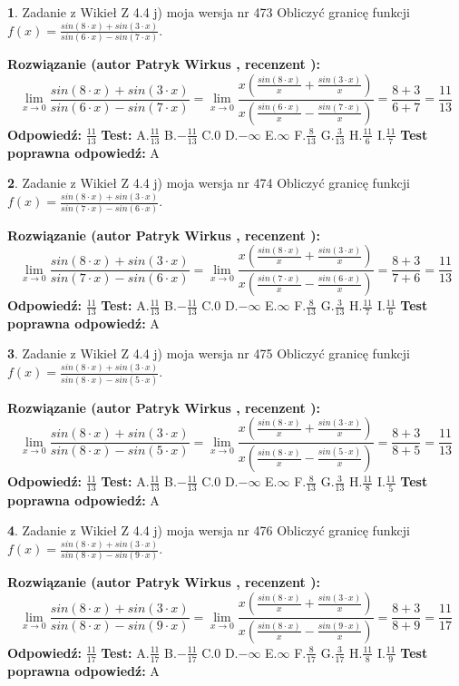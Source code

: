 \documentclass[12pt, a4paper]{article}
\theoremstyle{definition} %
\newtheorem{zad}{}
\newcommand{\zadStart}[1]{\begin{zad}#1\newline}
\newcommand{\zadStop}{\end{zad}}
\newcommand{\rozwStart}[2]{\noindent \textbf{Rozwiązanie (autor #1 , recenzent #2): }\newline}
\newcommand{\rozwStop}{\newline}
\newcommand{\odpStart}{\noindent \textbf{Odpowiedź:}\newline}
\newcommand{\odpStop}{\newline}
\newcommand{\testStart}{\noindent \textbf{Test:}\newline}
\newcommand{\testStop}{\newline}
\newcommand{\kluczStart}{\noindent \textbf{Test poprawna odpowiedź:}\newline}
\newcommand{\kluczStop}{\newline}
\begin{document}
\zadStart{Zadanie z Wikieł Z 4.4 j) moja wersja nr 473}
Obliczyć granicę funkcji $f(x)=\frac{sin(8\cdot x) +sin(3\cdot x)}{sin(6\cdot x) -sin(7\cdot x)}$.
\zadStop
\rozwStart{Patryk Wirkus}{}
$$\lim\limits_{x\to 0}\frac{sin(8\cdot x) +sin(3\cdot x)}{sin(6\cdot x) -sin(7\cdot x)}=\lim\limits_{x\to 0}\frac{x(\frac{sin(8\cdot x)}{x}+\frac{sin(3\cdot x)}{x})}{x(\frac{sin(6\cdot x)}{x}-\frac{sin(7\cdot x)}{x})}=\frac{8+3}{6+7} = \frac{11}{13}$$
\rozwStop
\odpStart
$\frac{11}{13}$
\odpStop
\testStart
A.$\frac{11}{13}$
B.$-\frac{11}{13}$
C.$0$
D.$-\infty$
E.$\infty$
F.$\frac{8}{13}$
G.$\frac{3}{13}$
H.$\frac{11}{6}$
I.$\frac{11}{7}$
\testStop
\kluczStart
A
\kluczStop



\zadStart{Zadanie z Wikieł Z 4.4 j) moja wersja nr 474}
Obliczyć granicę funkcji $f(x)=\frac{sin(8\cdot x) +sin(3\cdot x)}{sin(7\cdot x) -sin(6\cdot x)}$.
\zadStop
\rozwStart{Patryk Wirkus}{}
$$\lim\limits_{x\to 0}\frac{sin(8\cdot x) +sin(3\cdot x)}{sin(7\cdot x) -sin(6\cdot x)}=\lim\limits_{x\to 0}\frac{x(\frac{sin(8\cdot x)}{x}+\frac{sin(3\cdot x)}{x})}{x(\frac{sin(7\cdot x)}{x}-\frac{sin(6\cdot x)}{x})}=\frac{8+3}{7+6} = \frac{11}{13}$$
\rozwStop
\odpStart
$\frac{11}{13}$
\odpStop
\testStart
A.$\frac{11}{13}$
B.$-\frac{11}{13}$
C.$0$
D.$-\infty$
E.$\infty$
F.$\frac{8}{13}$
G.$\frac{3}{13}$
H.$\frac{11}{7}$
I.$\frac{11}{6}$
\testStop
\kluczStart
A
\kluczStop



\zadStart{Zadanie z Wikieł Z 4.4 j) moja wersja nr 475}
Obliczyć granicę funkcji $f(x)=\frac{sin(8\cdot x) +sin(3\cdot x)}{sin(8\cdot x) -sin(5\cdot x)}$.
\zadStop
\rozwStart{Patryk Wirkus}{}
$$\lim\limits_{x\to 0}\frac{sin(8\cdot x) +sin(3\cdot x)}{sin(8\cdot x) -sin(5\cdot x)}=\lim\limits_{x\to 0}\frac{x(\frac{sin(8\cdot x)}{x}+\frac{sin(3\cdot x)}{x})}{x(\frac{sin(8\cdot x)}{x}-\frac{sin(5\cdot x)}{x})}=\frac{8+3}{8+5} = \frac{11}{13}$$
\rozwStop
\odpStart
$\frac{11}{13}$
\odpStop
\testStart
A.$\frac{11}{13}$
B.$-\frac{11}{13}$
C.$0$
D.$-\infty$
E.$\infty$
F.$\frac{8}{13}$
G.$\frac{3}{13}$
H.$\frac{11}{8}$
I.$\frac{11}{5}$
\testStop
\kluczStart
A
\kluczStop



\zadStart{Zadanie z Wikieł Z 4.4 j) moja wersja nr 476}
Obliczyć granicę funkcji $f(x)=\frac{sin(8\cdot x) +sin(3\cdot x)}{sin(8\cdot x) -sin(9\cdot x)}$.
\zadStop
\rozwStart{Patryk Wirkus}{}
$$\lim\limits_{x\to 0}\frac{sin(8\cdot x) +sin(3\cdot x)}{sin(8\cdot x) -sin(9\cdot x)}=\lim\limits_{x\to 0}\frac{x(\frac{sin(8\cdot x)}{x}+\frac{sin(3\cdot x)}{x})}{x(\frac{sin(8\cdot x)}{x}-\frac{sin(9\cdot x)}{x})}=\frac{8+3}{8+9} = \frac{11}{17}$$
\rozwStop
\odpStart
$\frac{11}{17}$
\odpStop
\testStart
A.$\frac{11}{17}$
B.$-\frac{11}{17}$
C.$0$
D.$-\infty$
E.$\infty$
F.$\frac{8}{17}$
G.$\frac{3}{17}$
H.$\frac{11}{8}$
I.$\frac{11}{9}$
\testStop
\kluczStart
A
\kluczStop
\end{document}
